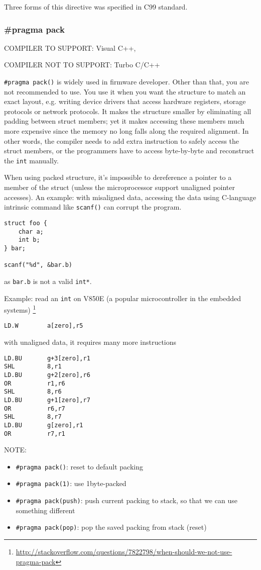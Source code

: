 Three forms of this directive was specified in C99 standard.

\subsubsection{\#pragma pack}

COMPILER TO SUPPORT: Visual C++,

COMPILER NOT TO SUPPORT: Turbo C/C++

\verb!#pragma pack()! is widely used in firmware developer. Other than that, you
are not recommended to use. You use it when you want the structure to match an
exact layout, e.g. writing device drivers that access hardware registers,
storage protocols or network protocols. It makes the structure smaller by
eliminating all padding between struct members; yet it makes accessing these
members much more expensive since the memory no long falls along the required
alignment. In other words, the compiler needs to add extra instruction to safely
access the struct members, or the programmers have to access byte-by-byte and
reconstruct the \verb!int! manually. 

When using packed structure, it's impossible to dereference a pointer to a
member of the struct (unless the microprocessor support unaligned pointer
accesses). An example: with misaligned data, accessing the data using C-language
intrinsic command like \verb!scanf()! can corrupt the program.
\begin{verbatim}
struct foo {
    char a;
    int b;
} bar;

scanf("%d", &bar.b)
\end{verbatim}
as \verb!bar.b! is not a valid \verb!int*!.

Example: read an \verb!int! on V850E (a popular microcontroller in the embedded
systems)
\footnote{\url{http://stackoverflow.com/questions/7822798/when-should-we-not-use-pragma-pack}}
\begin{verbatim}
LD.W        a[zero],r5
\end{verbatim}
with unaligned data, it requires many more instructions
\begin{verbatim}
LD.BU       g+3[zero],r1
SHL         8,r1
LD.BU       g+2[zero],r6
OR          r1,r6
SHL         8,r6
LD.BU       g+1[zero],r7
OR          r6,r7
SHL         8,r7
LD.BU       g[zero],r1
OR          r7,r1
\end{verbatim}

NOTE: 
\begin{itemize}
  \item \verb!#pragma pack()!: reset to default packing
  \item \verb!#pragma pack(1)!: use 1byte-packed
  \item \verb!#pragma pack(push)!: push current packing to stack, so that we can
  use something different
  \item \verb!#pragma pack(pop)!: pop the saved packing from stack (reset) 
\end{itemize}

